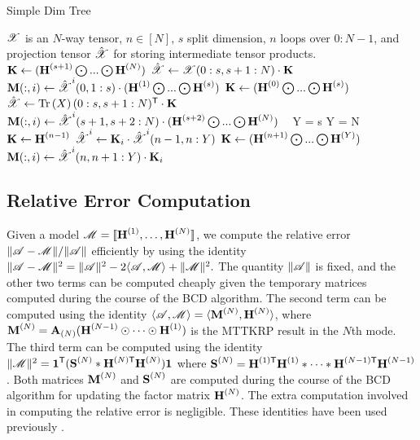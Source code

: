 \begin{algorithm}
\caption{Simple Dim Tree}
\label{alg:simpleDT}
\begin{algorithmic}
\Require $\T{X}$ is an $N$-way tensor, $n \in [N]$, $s$ split dimension, $n$ loops over $0:N-1$, and projection tensor $\hat{\T{X}}$ for storing intermediate tensor products.
		\State $\M{K} \leftarrow (\M{H}^{(s+1)} \bigodot ... \bigodot \M{H}^{(N)}) $
		\State $\hat{\T{X}} \leftarrow \T{X}(0:s,s+1:N) \cdot \M{K}$
			\State $\M{M}(:,i) \leftarrow \hat{\T{X}}^i(0,1:s) \cdot (\M{H}^{(1)} \bigodot ... \bigodot \M{H}^{(s)})$
		\EndFor
	\Else %
		\State $\M{K} \leftarrow (\M{H}^{(0)} \bigodot ... \bigodot \M{H}^{(s)})$
		\State $\hat{\T{X}} \leftarrow \Tr{X}(0:s,s+1:N)^\Tra \cdot \M{K}$
			\State $\M{M}(:,i) \leftarrow \hat{\T{X}}^i(s+1,s+2:N) \cdot (\M{H}^{(s+2)} \bigodot ... \bigodot \M{H}^{(N)})$
		\EndFor
	\EndIf
\
\Else
		\State Y = s
	\Else
		\State Y = N
	\EndIf
		\State  $\M{K} \leftarrow \M{H}^{(n-1)}$
		\State $\hat{\T{X}}^i \leftarrow \M{K}_i \cdot \hat{\T{X}}^i(n-1,n:Y)$ %
	\EndFor
		\State  $\M{K} \leftarrow (\M{H}^{(n+1)} \bigodot ... \bigodot \M{H}^{(Y)})$
		\State $\M{M}(:,i) \leftarrow \hat{\T{X}}^i(n,n+1:Y) \cdot \M{K}_i$
	\EndFor
\EndIf
\end{algorithmic}
\end{algorithm}

\subsection{Relative Error Computation}
\label{sec:error}

Given a model $\T{M}=\CP$, we compute the relative error $\|\TA - \T{M}\|/\|\TA\|$ efficiently by using the identity $\|\TA-\T{M}\|^2 = \|\TA\|^2 - 2\langle \TA, \T{M} \rangle + \|\T{M}\|^2.$
The quantity $\|\TA\|$ is fixed, and the other two terms can be computed cheaply given the temporary matrices computed during the course of the BCD algorithm.
The second term can be computed using the identity $\langle \TA, \T{M} \rangle = \langle \Mn{M}{N}, \Mn{H}{N} \rangle$, where $\Mn{M}{N} = \Mz{A}{N} (\Mn{H}{N-1} \Khat \cdots \Khat \Mn{H}{1})$ is the MTTKRP result in the $N$th mode.
The third term can be computed using the identity $\|\T{M}\|^2 = \V{1}^\Tra(\Mn{S}{N} \Hada \MnTra{H}{N} \Mn{H}{N})\V{1}$ where $\Mn{S}{N}=\MnTra{H}{1} \Mn{H}{1} \Hada \cdots \Hada \MnTra{H}{N-1} \Mn{H}{N-1}$.
Both matrices $\Mn{M}{N}$ and $\Mn{S}{N}$ are computed during the course of the BCD algorithm for updating the factor matrix $\Mn{H}{N}$.
The extra computation involved in computing the relative error is negligible.
These identities have been used previously \cite{KB2009,TensorBox,SK16,LKLHS2017}.

